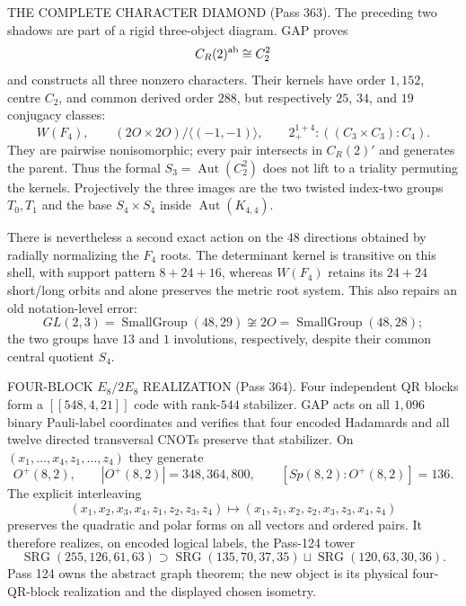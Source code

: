 \documentclass[12pt,a4paper]{article}
\def\mathbb#1{#1}%
\def\textbf#1{#1}%
\theoremstyle{definition}
\begin{document}
\begin{center}
{{\smallskip
\textbf{THE COMPLETE CHARACTER DIAMOND (Pass 363).}  The preceding two
shadows are part of a rigid three-object diagram.  GAP proves
\[
 C_{\mathbb R}(2)^{\rm ab}\cong C_2^2
\]
and constructs all three nonzero characters.  Their kernels have order
$1{,}152$, centre $C_2$, and common derived order $288$, but respectively
$25$, $34$, and $19$ conjugacy classes:
\[
 W(F_4),\qquad
 (2O\times2O)/\langle(-1,-1)\rangle,\qquad
 2_+^{1+4}:((C_3\times C_3):C_4).
\]
They are pairwise nonisomorphic; every pair intersects in
$C_{\mathbb R}(2)'$ and generates the parent.  Thus the formal
$S_3=\operatorname{Aut}(C_2^2)$ does not lift to a triality permuting the
kernels.  Projectively the three images are the two twisted index-two groups
$T_0,T_1$ and the base $S_4\times S_4$ inside
$\operatorname{Aut}(K_{4,4})$.

There is nevertheless a second exact action on the $48$ directions obtained
by radially normalizing the $F_4$ roots.  The determinant kernel is transitive
on this shell, with support pattern $8+24+16$, whereas $W(F_4)$ retains its
$24+24$ short/long orbits and alone preserves the metric root system.  This
also repairs an old notation-level error:
\[
 GL(2,3)=\operatorname{SmallGroup}(48,29)
 \not\cong 2O=\operatorname{SmallGroup}(48,28);
\]
the two groups have $13$ and $1$ involutions, respectively, despite their
common central quotient $S_4$.

\smallskip
\textbf{FOUR-BLOCK $E_8/2E_8$ REALIZATION (Pass 364).}  Four independent
QR blocks form a $[[548,4,21]]$ code with rank-$544$ stabilizer.  GAP acts on
all $1{,}096$ binary Pauli-label coordinates and verifies that four encoded
Hadamards and all twelve directed transversal CNOTs preserve that stabilizer.
On $(x_1,\ldots,x_4,z_1,\ldots,z_4)$ they generate
\[
 O^+(8,2),\qquad |O^+(8,2)|=348{,}364{,}800,\qquad
 [Sp(8,2):O^+(8,2)]=136.
\]
The explicit interleaving
\[
 (x_1,x_2,x_3,x_4,z_1,z_2,z_3,z_4)
 \longmapsto(x_1,z_1,x_2,z_2,x_3,z_3,x_4,z_4)
\]
preserves the quadratic and polar forms on all vectors and ordered pairs.
It therefore realizes, on encoded logical labels, the Pass-124 tower
\[
 \operatorname{SRG}(255,126,61,63)
 \supset
 \operatorname{SRG}(135,70,37,35)
 \sqcup
 \operatorname{SRG}(120,63,30,36).
\]
Pass 124 owns the abstract graph theorem; the new object is its physical
four-QR-block realization and the displayed chosen isometry.

}}
\end{center}
\end{document}

